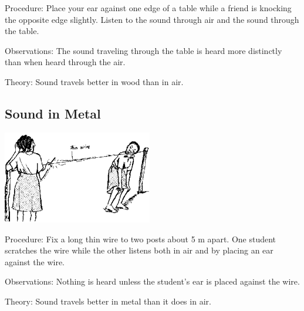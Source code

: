 \begin{multicols}{2}
\begin{description*}
\item[Procedure:]{Place your ear against one edge of a table while a friend is knocking the opposite edge slightly. Listen to the sound through air and the sound through the table.}
\item[Observations:]{The sound traveling through the table is heard more distinctly than when heard through the air.}
\item[Theory:]{Sound travels better in wood than in air.}
\end{description*}

\subsection{Sound in Metal}

\begin{center}
\includegraphics[width=0.49\textwidth]{./img/source/sound-in-metal.png}
\end{center}

\begin{description*}
\item[Procedure:]{Fix a long thin wire to two posts about 5 m apart. One student scratches the wire while the other listens both in air and by placing an ear against the wire.}
\item[Observations:]{Nothing is heard unless the student's ear is placed against the wire.}
\item[Theory:]{Sound travels better in metal than it does in air.}
\end{description*}


\end{multicols}
